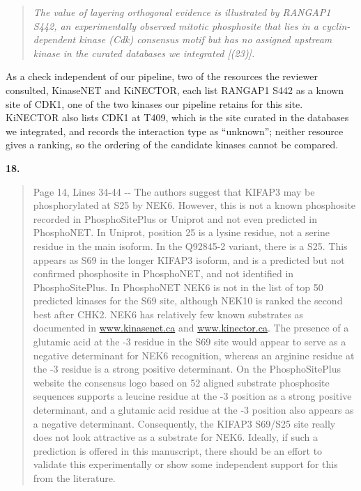 \documentclass[
]{article}
\begin{document}
\begin{quote}
\emph{The value of layering orthogonal evidence is illustrated by
RANGAP1 S442, an experimentally observed mitotic phosphosite that lies
in a cyclin-dependent kinase (Cdk) consensus motif but has no assigned
upstream kinase in the curated databases we integrated {[}(23){]}.}
\end{quote}

As a check independent of our pipeline, two of the resources the
reviewer consulted, KinaseNET and KiNECTOR, each list RANGAP1 S442 as a
known site of CDK1, one of the two kinases our pipeline retains for this
site. KiNECTOR also lists CDK1 at T409, which is the site curated in the
databases we integrated, and records the interaction type as
``unknown''; neither resource gives a ranking, so the ordering of the
candidate kinases cannot be compared.

\textbf{18.}

\begin{quote}
Page 14, Lines 34-44 -\/- The authors suggest that KIFAP3 may be
phosphorylated at S25 by NEK6. However, this is not a known phosphosite
recorded in PhosphoSitePlus or Uniprot and not even predicted in
PhosphoNET. In Uniprot, position 25 is a lysine residue, not a serine
residue in the main isoform. In the Q92845-2 variant, there is a S25.
This appears as S69 in the longer KIFAP3 isoform, and is a predicted but
not confirmed phosphosite in PhosphoNET, and not identified in
PhosphoSitePlus. In PhosphoNET NEK6 is not in the list of top 50
predicted kinases for the S69 site, although NEK10 is ranked the second
best after CHK2. NEK6 has relatively few known substrates as documented
in \href{http://www.kinasenet.ca}{www.kinasenet.ca} and
\href{http://www.kinector.ca}{www.kinector.ca}. The presence of a
glutamic acid at the -3 residue in the S69 site would appear to serve as
a negative determinant for NEK6 recognition, whereas an arginine residue
at the -3 residue is a strong positive determinant. On the
PhosphoSitePlus website the consensus logo based on 52 aligned substrate
phosphosite sequences supports a leucine residue at the -3 position as a
strong positive determinant, and a glutamic acid residue at the -3
position also appears as a negative determinant. Consequently, the
KIFAP3 S69/S25 site really does not look attractive as a substrate for
NEK6. Ideally, if such a prediction is offered in this manuscript, there
should be an effort to validate this experimentally or show some
independent support for this from the literature.
\end{quote}
\end{document}
